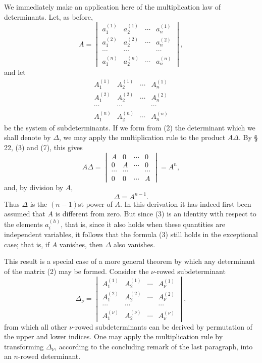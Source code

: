 \documentclass[11pt]{article}
\begin{document}
We immediately make an application here of the multiplication law of determinants. Let, as before,
\[
A=\begin{vmatrix}
 a_1^{(1)}&a_2^{(1)}&\cdots&a_n^{(1)}\\
 a_1^{(2)}&a_2^{(2)}&\cdots&a_n^{(2)}\\
 \cdots&\cdots&&\cdots\\
 a_1^{(n)}&a_2^{(n)}&\cdots&a_n^{(n)}
\end{vmatrix},\tag{1}
\]
and let
\[
\begin{matrix}
 A_1^{(1)}&A_2^{(1)}&\cdots&A_n^{(1)}\\
 A_1^{(2)}&A_2^{(2)}&\cdots&A_n^{(2)}\\
 \cdots&\cdots&&\cdots\\
 A_1^{(n)}&A_2^{(n)}&\cdots&A_n^{(n)}
\end{matrix}\tag{2}
\]
be the system of subdeterminants. If we form from (2) the determinant which we shall denote by $\Delta$, we may apply the multiplication rule to the product $A\Delta$. By § 22, (3) and (7), this gives
\[
 A\Delta=\begin{vmatrix}
 A&0&\cdots&0\\
 0&A&\cdots&0\\
 \cdots&\cdots&&\cdots\\
 0&0&\cdots&A
\end{vmatrix}=A^n,
\]
and, by division by $A$,
\begin{equation}
 \Delta=A^{n-1}.\tag{3}
\end{equation}
Thus $\Delta$ is the $(n-1)$st power of $A$. In this derivation it has indeed first been assumed that $A$ is different from zero. But since (3) is an identity with respect to the elements $a_i^{(h)}$, that is, since it also holds when these quantities are independent variables, it follows that the formula (3) still holds in the exceptional case; that is, if $A$ vanishes, then $\Delta$ also vanishes.

This result is a special case of a more general theorem by which any determinant of the matrix (2) may be formed. Consider the $\nu$-rowed subdeterminant
\[
\Delta_\nu=\begin{vmatrix}
 A_1^{(1)}&A_2^{(1)}&\cdots&A_\nu^{(1)}\\
 A_1^{(2)}&A_2^{(2)}&\cdots&A_\nu^{(2)}\\
 \cdots&\cdots&&\cdots\\
 A_1^{(\nu)}&A_2^{(\nu)}&\cdots&A_\nu^{(\nu)}
\end{vmatrix},\tag{4}
\]
from which all other $\nu$-rowed subdeterminants can be derived by permutation of the upper and lower indices. One may apply the multiplication rule by transforming $\Delta_\nu$, according to the concluding remark of the last paragraph, into an $n$-rowed determinant.
\end{document}
